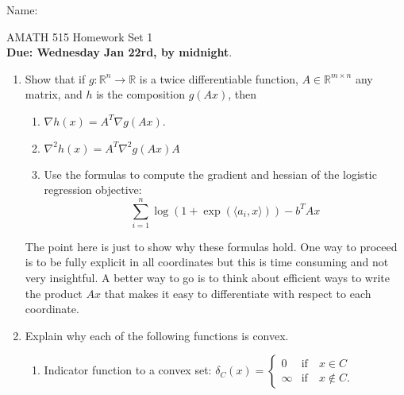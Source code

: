 \documentclass[11pt]{amsart}
\begin{document}
{\Large Name:}  \\
\begin{center}
\Large AMATH 515 \hskip 2in Homework Set 1\\
{\bf Due:  Wednesday Jan 22rd, by midnight}. 
\end{center}
\bigskip
\begin{enumerate}

%
%
%

\item Show that if $g:\mathbb{R}^n \rightarrow \mathbb{R}$ is a twice differentiable function,  $A \in \mathbb{R}^{m\times n}$ any matrix, 
and $h$ is the composition $g(Ax)$, then  
\begin{enumerate}
\item $\nabla h(x) = A^T \nabla g(Ax)$. 
\item $\nabla^2 h(x) = A^T \nabla^2 g(Ax) A$
\item Use the formulas to compute the gradient and hessian of the logistic regression objective: 
\[
\sum_{i=1}^n \log(1+\exp(\langle a_i, x\rangle))- b^TAx
\]
\end{enumerate}

The point here is just to show why these formulas hold. One way to proceed is to be fully explicit in all coordinates but this is time consuming and not very insightful. A better way to go is to think about efficient ways to write the 
product $Ax$ that makes it easy to differentiate with respect to each coordinate. 


\bigskip\bigskip


\item Explain why each of the following functions is convex. 

\begin{enumerate}
\item Indicator function to a convex set: 
\(
\delta_C(x) = \begin{cases} 0 & \mbox{if} \quad x \in C \\ \infty & \mbox{if} \quad x \not \in C. \end{cases}
\)


\end{enumerate}
\end{enumerate}
\end{document}
